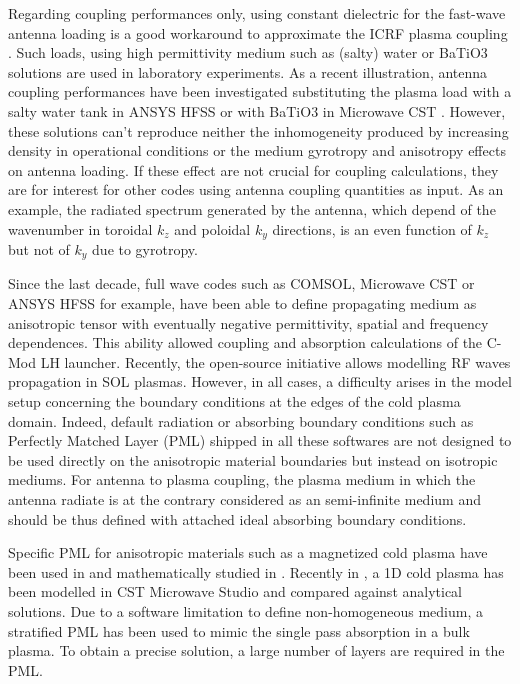 \documentclass[preprint,3p,twocolumn]{elsarticle}
\begin{document}
Regarding coupling performances only, using constant dielectric for the fast-wave antenna loading is a good workaround to approximate the ICRF plasma coupling \cite{Messiaen2011a}. Such loads, using high permittivity medium such as (salty) water\cite{Messiaen2005} or BaTiO3 solutions\cite{Helou2018} are used in laboratory experiments. As a recent illustration, antenna coupling performances have been investigated substituting the plasma load  with a salty water tank in ANSYS HFSS \cite{Ravera2012, Qin2015} or with BaTiO3 in Microwave CST \cite{Bottollier-Curtet2011}. However, these solutions can't reproduce neither the inhomogeneity produced by increasing density in operational conditions or the medium gyrotropy and anisotropy effects on antenna loading. If these effect are not crucial for coupling calculations, they are for interest for other codes using antenna coupling quantities as input. As an example, the radiated spectrum generated by the antenna, which depend of the wavenumber in toroidal $k_z$ and poloidal $k_y$ directions, is an even function of $k_z$ but not of $k_y$ due to gyrotropy.

Since the last decade, full wave codes such as {COMSOL}, Microwave {CST} or {ANSYS} {HFSS} for example, have been able to define propagating medium as anisotropic tensor with eventually negative permittivity, spatial and frequency dependences. This ability allowed coupling\cite{Meneghini2009g, Shiraiwa2009} and absorption\cite{Meneghini2009} calculations of the C-Mod LH launcher. Recently, the open-source initiative \cite{Shiraiwa2017} allows modelling RF waves propagation in SOL plasmas. However, in all cases, a difficulty arises in the model setup concerning the boundary conditions at the edges of the cold plasma domain. Indeed, default radiation or absorbing boundary conditions such as Perfectly Matched Layer (PML) shipped in all these softwares are not designed to be used directly on the anisotropic material boundaries but instead on isotropic mediums. For antenna to plasma coupling, the plasma medium in which the antenna radiate is at the contrary considered as an semi-infinite medium and should be thus defined with attached ideal absorbing boundary conditions. 

Specific PML for anisotropic materials such as a magnetized cold plasma have been used in \cite{Jacquot2013b} and mathematically studied in  \cite{Becache2016, Becache2018}. Recently in \cite{Louche2017}, a 1D cold plasma has been modelled in CST Microwave Studio and compared against analytical solutions. Due to a software limitation to define non-homogeneous medium, a stratified PML has been used to mimic the single pass absorption in a bulk plasma. To obtain a precise solution, a large number of layers are required in the PML. 
\end{document}
